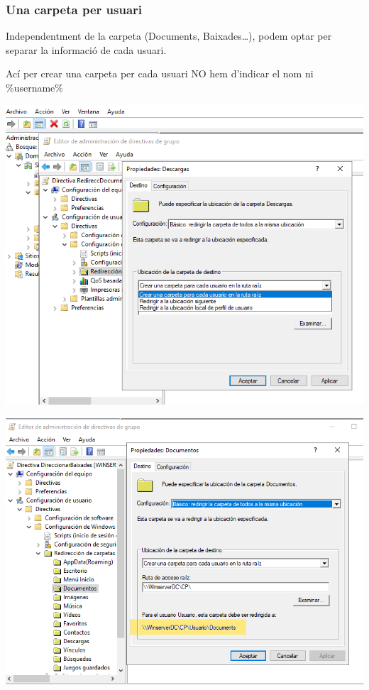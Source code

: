 \documentclass[
  a4paper,
]{article}
\begin{document}
\subsubsection{Una carpeta per usuari}\label{una-carpeta-per-usuari}

Independentment de la carpeta (Documents, Baixades\ldots), podem optar
per separar la informació de cada usuari.

Ací per crear una carpeta per cada usuari NO hem d'indicar el nom ni
\%username\%

\includegraphics{png/CrearCarpeta.png}

\includegraphics{png/CrearCarpetaRuta.png}
\end{document}
